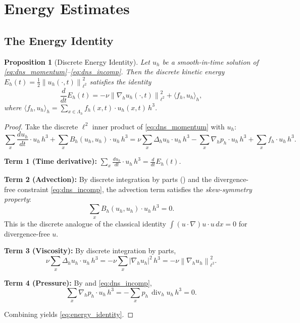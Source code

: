 \documentclass[12pt, a4paper]{article}
\theoremstyle{plain}
\newtheorem{proposition}[theorem]{Proposition}
\theoremstyle{definition}
\theoremstyle{remark}
\newcommand{\norm}[1]{\left\| #1 \right\|}
\newcommand{\inner}[2]{\langle #1, #2 \rangle}
\newcommand{\grad}{\nabla_h}
\newcommand{\lapl}{\Delta_h}
\newcommand{\divh}{\operatorname{div}_h}
\newcommand{\uh}{u_h}
\newcommand{\ph}{p_h}
\begin{document}
\section{Energy Estimates}\label{sec:energy}

\subsection{The Energy Identity}

\begin{proposition}[Discrete Energy Identity]\label{prop:energy_id}
  Let $\uh$ be a smooth-in-time solution of \eqref{eq:dns_momentum}--\eqref{eq:dns_incomp}.
  Then the discrete kinetic energy $E_h(t) = \frac{1}{2}\norm{\uh(\cdot,t)}_{\ell^2}^2$
  satisfies the identity
  \begin{equation}\label{eq:energy_identity}
    \frac{d}{dt}E_h(t) = -\nu\norm{\grad\uh(\cdot,t)}_{\ell^2}^2 + \inner{f_h}{\uh}_h,
  \end{equation}
  where $\inner{f_h}{\uh}_h = \sum_{x \in \Lambda_h} f_h(x,t) \cdot \uh(x,t) \, h^3$.
\end{proposition}

\begin{proof}
  Take the discrete $\ell^2$ inner product of \eqref{eq:dns_momentum} with $\uh$:
  \begin{equation}
    \sum_{x} \frac{d\uh}{dt} \cdot \uh \, h^3
    + \sum_{x} B_h(\uh,\uh) \cdot \uh \, h^3
    = \nu \sum_{x} \lapl\uh \cdot \uh \, h^3
    - \sum_{x} \grad\ph \cdot \uh \, h^3
    + \sum_{x} f_h \cdot \uh \, h^3.
  \end{equation}

  \textbf{Term 1 (Time derivative):}
  $\sum_{x} \frac{d\uh}{dt} \cdot \uh \, h^3 = \frac{d}{dt}E_h(t)$.

  \textbf{Term 2 (Advection):} By discrete integration by parts
  () and the divergence-free constraint \eqref{eq:dns_incomp},
  the advection term satisfies the \emph{skew-symmetry property}:
  \begin{equation}\label{eq:skew}
    \sum_{x} B_h(\uh,\uh) \cdot \uh \, h^3 = 0.
  \end{equation}
  This is the discrete analogue of the classical identity
  $\int (u \cdot \nabla)u \cdot u \, dx = 0$ for divergence-free $u$.

  \textbf{Term 3 (Viscosity):} By discrete integration by parts,
  \begin{equation}
    \nu \sum_{x} \lapl\uh \cdot \uh \, h^3
    = -\nu \sum_{x} |\grad\uh|^2 \, h^3
    = -\nu \norm{\grad\uh}_{\ell^2}^2.
  \end{equation}

  \textbf{Term 4 (Pressure):} By  and \eqref{eq:dns_incomp},
  \begin{equation}
    \sum_{x} \grad\ph \cdot \uh \, h^3 = -\sum_{x} \ph \, \divh\uh \, h^3 = 0.
  \end{equation}

  Combining yields \eqref{eq:energy_identity}.
\end{proof}
\end{document}
